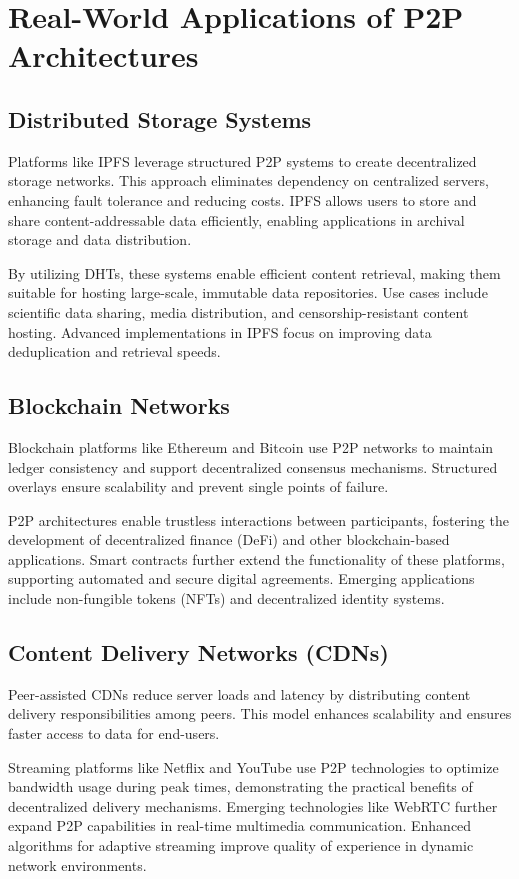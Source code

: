 \documentclass[12pt]{article}
\begin{document}
\section{Real-World Applications of P2P Architectures}

\subsection{Distributed Storage Systems}
Platforms like IPFS leverage structured P2P systems to create decentralized storage networks. This approach eliminates dependency on centralized servers, enhancing fault tolerance and reducing costs. IPFS allows users to store and share content-addressable data efficiently, enabling applications in archival storage and data distribution.

By utilizing DHTs, these systems enable efficient content retrieval, making them suitable for hosting large-scale, immutable data repositories. Use cases include scientific data sharing, media distribution, and censorship-resistant content hosting. Advanced implementations in IPFS focus on improving data deduplication and retrieval speeds.

\subsection{Blockchain Networks}
Blockchain platforms like Ethereum and Bitcoin use P2P networks to maintain ledger consistency and support decentralized consensus mechanisms. Structured overlays ensure scalability and prevent single points of failure.

P2P architectures enable trustless interactions between participants, fostering the development of decentralized finance (DeFi) and other blockchain-based applications. Smart contracts further extend the functionality of these platforms, supporting automated and secure digital agreements. Emerging applications include non-fungible tokens (NFTs) and decentralized identity systems.

\subsection{Content Delivery Networks (CDNs)}
Peer-assisted CDNs reduce server loads and latency by distributing content delivery responsibilities among peers. This model enhances scalability and ensures faster access to data for end-users.

Streaming platforms like Netflix and YouTube use P2P technologies to optimize bandwidth usage during peak times, demonstrating the practical benefits of decentralized delivery mechanisms. Emerging technologies like WebRTC further expand P2P capabilities in real-time multimedia communication. Enhanced algorithms for adaptive streaming improve quality of experience in dynamic network environments.
\end{document}
